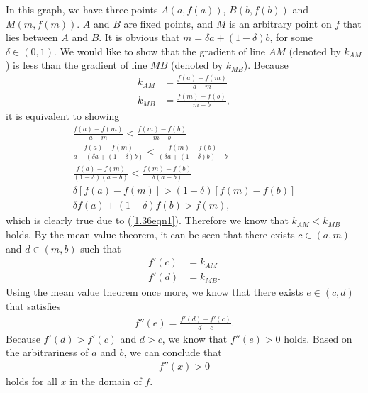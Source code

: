 \begin{answer}{}
	In this graph, we have three points $A(a, f(a))$, $B(b, f(b))$ and $M(m, f(m))$. $A$ and $B$ are fixed points, and $M$ is an arbitrary point on $f$ that lies between $A$ and $B$. It is obvious that $m = \delta a + (1-\delta)b$, for some $\delta \in (0, 1)$. We would like to show that the gradient of line $AM$ (denoted by $k_{AM}$) is less than the gradient of line $MB$ (denoted by $k_{MB}$). Because
	\begin{align}
		k_{AM} &= \frac{f(a) - f(m)}{a - m}\\
		k_{MB} &= \frac{f(m) - f(b)}{m - b},
	\end{align}
	it is equivalent to showing
	\begin{gather}
		\frac{f(a) - f(m)}{a - m} <  \frac{f(m) - f(b)}{m - b}\\
		\frac{f(a) - f(m)}{a - (\delta a + (1-\delta)b)} <  \frac{f(m) - f(b)}{(\delta a + (1-\delta)b) - b}\\
		\frac{f(a) - f(m)}{(1-\delta)(a - b)} <  \frac{f(m) - f(b)}{\delta (a - b)}\\
		\delta \left[ f(a) - f(m) \right] > (1-\delta) \left[ f(m) - f(b) \right]\\
		\delta f(a) + (1-\delta) f(b) > f(m),
	\end{gather}
	which is clearly true due to (\ref{1.36eqn1}). Therefore we know that $k_{AM} < k_{MB}$ holds. By the mean value theorem, it can be seen that there exists $c \in (a, m)$ and $d \in (m, b)$ such that
	\begin{align}
		f'(c) &= k_{AM}\\
		f'(d) &= k_{MB}.
	\end{align}
	Using the mean value theorem once more, we know that there exists $e \in (c, d)$ that satisfies
	\begin{align}
		f''(e) = \frac{f'(d) - f'(c)}{d - c}.
	\end{align}
	Because $f'(d) > f'(c)$ and $d > c$, we know that $f''(e) > 0$ holds. Based on the arbitrariness of $a$ and $b$, we can conclude that
	\begin{align}
		f''(x) > 0
	\end{align}
	holds for all $x$ in the domain of $f$.
\end{answer}